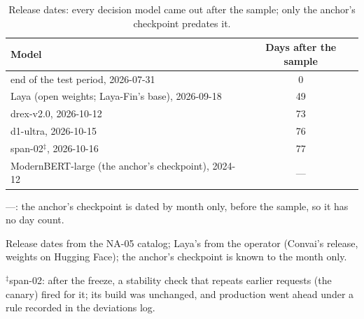 \begin{table}[htbp]
\centering
\small
\begin{threeparttable}
\caption{Release dates: every decision model came out after the sample; only the anchor's checkpoint predates it.}\label{tab:a-release-dates}
\begin{tabular}{@{}lS[table-format=2.0]@{}}
\toprule
Model & {Days after the sample} \\
\midrule
end of the test period, 2026-07-31 & 0 \\
Laya (open weights; Laya-Fin's base), 2026-09-18 & 49 \\
drex-v2.0, 2026-10-12 & 73 \\
d1-ultra, 2026-10-15 & 76 \\
span-02$^{\ddagger}$, 2026-10-16 & 77 \\
ModernBERT-large (the anchor's checkpoint), 2024-12 & {---} \\
\bottomrule
\end{tabular}
\begin{tablenotes}[flushleft]\footnotesize
\item ---: the anchor's checkpoint is dated by month only, before the sample, so it has no day count.
\item Release dates from the NA-05 catalog; Laya's from the operator (Convai's release, weights on Hugging Face); the anchor's checkpoint is known to the month only.
\item $^{\ddagger}$span-02: after the freeze, a stability check that repeats earlier requests (the canary) fired for it; its build was unchanged, and production went ahead under a rule recorded in the deviations log.
\end{tablenotes}
\end{threeparttable}
\end{table}
